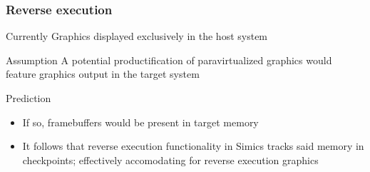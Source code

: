 \begin{frame}

\frametitle{Reverse execution}

\begin{block}{Currently}
	Graphics displayed exclusively in the host system
\end{block}

\begin{block}{Assumption}
	A potential productification of paravirtualized graphics would feature graphics output in the target system
\end{block}

\begin{block}{Prediction}
	\begin{itemize}
		\item If so, framebuffers would be present in target memory
		\item It follows that reverse execution functionality in Simics tracks said memory in checkpoints; effectively accomodating for reverse execution graphics
	\end{itemize}
\end{block}

\end{frame}
